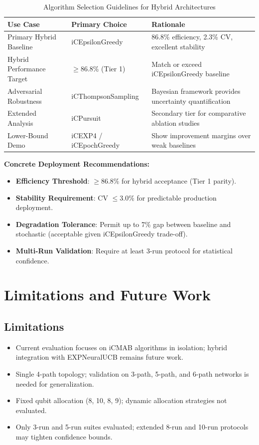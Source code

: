 \documentclass[12pt,a4paper]{article}
\begin{document}
\begin{table}[H]
\centering
\caption{Algorithm Selection Guidelines for Hybrid Architectures}
\begin{tabular}{@{}lll@{}}
\toprule
\textbf{Use Case} & \textbf{Primary Choice} & \textbf{Rationale} \\
\midrule
Primary Hybrid Baseline & iCEpsilonGreedy & 86.8\% efficiency, 2.3\% CV, excellent stability \\
Hybrid Performance Target & $\geq$86.8\% (Tier 1) & Match or exceed iCEpsilonGreedy baseline \\
Adversarial Robustness & iCThompsonSampling & Bayesian framework provides uncertainty quantification \\
Extended Analysis & iCPursuit & Secondary tier for comparative ablation studies \\
Lower-Bound Demo & iCEXP4 / iCEpochGreedy & Show improvement margins over weak baselines \\
\bottomrule
\end{tabular}
\end{table}

\textbf{Concrete Deployment Recommendations:}
\begin{itemize}
\item \textbf{Efficiency Threshold}: $\geq$86.8\% for hybrid acceptance (Tier 1 parity).
\item \textbf{Stability Requirement}: CV $\leq$3.0\% for predictable production deployment.
\item \textbf{Degradation Tolerance}: Permit up to 7\% gap between baseline and stochastic (acceptable given iCEpsilonGreedy trade-off).
\item \textbf{Multi-Run Validation}: Require at least 3-run protocol for statistical confidence.
\end{itemize}

\section{Limitations and Future Work}

\subsection{Limitations}
\begin{itemize}
\item Current evaluation focuses on iCMAB algorithms in isolation; hybrid integration with EXPNeuralUCB remains future work.
\item Single 4-path topology; validation on 3-path, 5-path, and 6-path networks is needed for generalization.
\item Fixed qubit allocation (8, 10, 8, 9); dynamic allocation strategies not evaluated.
\item Only 3-run and 5-run suites evaluated; extended 8-run and 10-run protocols may tighten confidence bounds.
\end{itemize}
\end{document}
